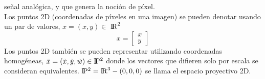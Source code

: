 señal analógica, y que genera la noción de píxel.\\
Los puntos 2D (coordenadas de píxeles en una imagen) se pueden denotar usando un par de valores, $x = (x,y) \in$ ${\rm I\!R}^2$
\cite{Richard2011}
\begin{equation}
    x = \left[ 
        \begin{array}{c} 
            x \\ 
            y 
        \end{array} 
        \right]   
\end{equation}
Los puntos 2D también se pueden representar utilizando coordenadas homogéneas, $\tilde{x} = 
(\tilde{x},\tilde{y}, \tilde{w}) \in \rm I\!P^2$ donde los vectores que difieren solo por escala 
se consideran equivalentes. $\rm I\!P^2 = {\rm I\!R}^3 - (0,0,0) $ se llama el espacio proyectivo 2D.


